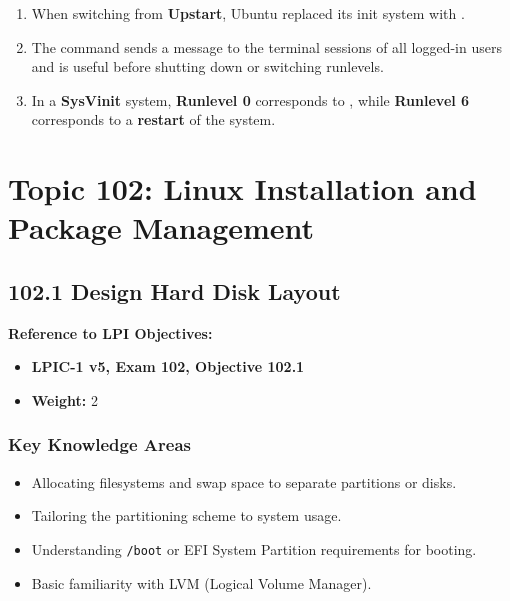 \documentclass[a4paper]{report}
\begin{document}
\begin{enumerate}[1.]
\item When switching from \textbf{Upstart}, Ubuntu replaced its init system with \textbf{\underline{\hspace{2cm}}}.

\item The \textbf{\underline{\hspace{2cm}}} command sends a message to the terminal sessions of all logged-in users and is useful before shutting down or switching runlevels.

\item In a \textbf{SysVinit} system, \textbf{Runlevel 0} corresponds to \textbf{\underline{\hspace{2cm}}}, while \textbf{Runlevel 6} corresponds to a \textbf{restart} of the system.

\end{enumerate}

\chapter{Topic 102: Linux Installation and Package Management}

\newpage

\section*{102.1 Design Hard Disk Layout}


\textbf{Reference to LPI Objectives:}
\begin{itemize}
    \item \textbf{LPIC-1 v5, Exam 102, Objective 102.1}
    \item \textbf{Weight:} 2
\end{itemize}

\subsection*{Key Knowledge Areas}
\begin{itemize}
    \item Allocating filesystems and swap space to separate partitions or disks.
    \item Tailoring the partitioning scheme to system usage.
    \item Understanding \texttt{/boot} or EFI System Partition requirements for booting.
    \item Basic familiarity with LVM (Logical Volume Manager).
\end{itemize}
\end{document}
